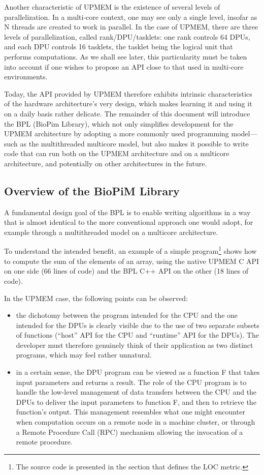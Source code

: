 Another characteristic of UPMEM is the existence of several levels of parallelization. In a multi-core context, one may see only a single level, insofar as N threads are created to work in parallel. In the case of UPMEM, there are three levels of parallelization, called rank/DPU/tasklets: one rank controls 64 DPUs, and each DPU controls 16 tasklets, the tasklet being the logical unit that performs computations. As we shall see later, this particularity must be taken into account if one wishes to propose an API close to that used in multi-core environments.

Today, the API provided by UPMEM therefore exhibits intrinsic characteristics of the hardware architecture’s very design, which makes learning it and using it on a daily basis rather delicate. The remainder of this document will introduce the BPL (BioPim Library), which not only simplifies development for the UPMEM architecture by adopting a more commonly used programming model—such as the multithreaded multicore model, but also makes it possible to write code that can run both on the UPMEM architecture and on a multicore architecture, and potentially on other architectures in the future.

\subsection{Overview of the BioPiM Library}

A fundamental design goal of the BPL is to enable writing algorithms in a way that is almost identical to the more conventional approach one would adopt, for example through a multithreaded model on a multicore architecture.

To understand the intended benefit, an example of a simple program\footnote{The source code is presented in the section that defines the LOC metric.} shows how to compute the sum of the elements of an array, using the native UPMEM C API on one side (66 lines of code) and the BPL C++ API on the other (18 lines of code).

In the UPMEM case, the following points can be observed:
\begin{itemize}
\item the dichotomy between the program intended for the CPU and the one intended for the DPUs is clearly visible due to the use of two separate subsets of functions (“host” API for the CPU and “runtime” API for the DPUs). The developer must therefore genuinely think of their application as two distinct programs, which may feel rather unnatural.
\item in a certain sense, the DPU program can be viewed as a function F that takes input parameters and returns a result. The role of the CPU program is to handle the low-level management of data transfers between the CPU and the DPUs to deliver the input parameters to function F, and then to retrieve the function’s output. This management resembles what one might encounter when computation occurs on a remote node in a machine cluster, or through a Remote Procedure Call (RPC) mechanism allowing the invocation of a remote procedure.
\end{itemize}

